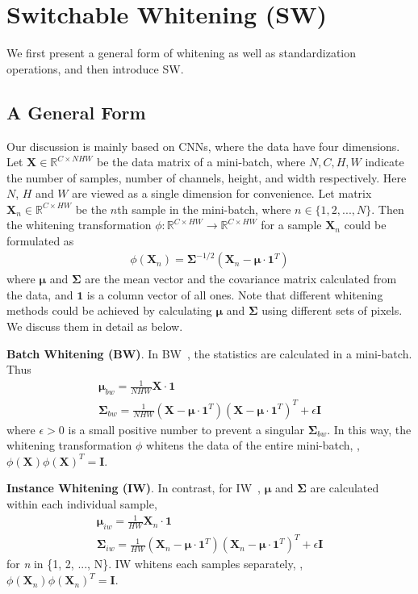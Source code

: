 \documentclass[10pt,twocolumn,letterpaper]{article}
\begin{document}
%
 	\section{Switchable Whitening (SW)}

We first present a general form of whitening as well as standardization operations, and then introduce SW.

\subsection{A General Form}

Our discussion is mainly based on CNNs, where the data have four dimensions.
Let \(\mathbf{X}\in\mathbb{R}^{C \times NHW} \) be the data matrix of a mini-batch, where \(N, C, H, W\) indicate the number of samples, number of channels, height, and width respectively.
Here \(N\), \(H\) and \(W\) are viewed as a single dimension for convenience.
Let matrix \(\mathbf{X}_n \in \mathbb{R}^{C \times HW} \) be the \(n\)th sample in the mini-batch, where \(n \in \{1, 2,..., N\}\).
Then the whitening transformation \(\phi : \mathbb{R}^{C \times HW} \to \mathbb{R}^{C \times HW} \) for a sample \(\mathbf{X}_n\) could be formulated as
\begin{align}
\phi(\mathbf{X}_n) = \bm{\Sigma}^{-1/2}(\mathbf{X}_n - \bm{\mu} \cdot \mathbf{1}^T)
\end{align}
where \(\bm{\mu}\) and \(\bm{\Sigma}\) are the mean vector and the covariance matrix calculated from the data, and \(\mathbf{1}\) is a column vector of all ones.
Note that different whitening methods could be achieved by calculating \(\bm{\mu}\) and \(\bm{\Sigma}\) using different sets of pixels.
We discuss them in detail as below.


\textbf{Batch Whitening (BW)}.
In BW~\cite{lei2018decorrelated}, the statistics are calculated in a mini-batch.
Thus 
\begin{gather}
\bm{\mu}_{bw} = \frac{1}{NHW} \mathbf{X} \cdot \mathbf{1}  \nonumber \\
\bm{\Sigma}_{bw} = \frac{1}{NHW}(\mathbf{X} - \bm{\mu} \cdot \mathbf{1}^T)(\mathbf{X} - \bm{\mu} \cdot \mathbf{1}^T)^T + \epsilon \mathbf{I}
\end{gather}
where \(\epsilon > 0\) is a small positive number to prevent a singular \(\bm{\Sigma}_{bw}\).
In this way, the whitening transformation \(\phi\) whitens the data of the entire mini-batch, \ie, \(\phi(\mathbf{X})\phi(\mathbf{X})^T = \mathbf{I}\).


\textbf{Instance Whitening (IW)}.
In contrast, for IW~\cite{li2017universal}, \(\bm{\mu}\) and \(\bm{\Sigma}\) are calculated within each individual sample,
\begin{gather}
\bm{\mu}_{iw} = \frac{1}{HW} \mathbf{X}_n \cdot \mathbf{1}  \nonumber \\
\bm{\Sigma}_{iw} = \frac{1}{HW}(\mathbf{X}_n - \bm{\mu} \cdot \mathbf{1}^T)(\mathbf{X}_n - \bm{\mu} \cdot \mathbf{1}^T)^T + \epsilon \mathbf{I}
\end{gather}
for \textit{n} in \{1, 2, ..., N\}.
IW whitens each samples separately, \ie, \(\phi(\mathbf{X}_n)\phi(\mathbf{X}_n)^T = \mathbf{I}\). 
~\\
\end{document}
